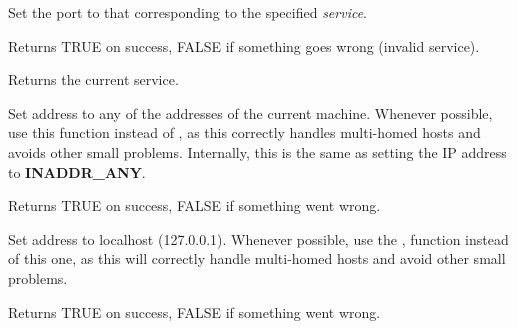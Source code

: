 %
%



Set the port to that corresponding to the specified {\it service}.


Returns TRUE on success, FALSE if something goes wrong
(invalid service).

%
%



Returns the current service.

%
%

\label{wxipv4addressanyaddress}


Set address to any of the addresses of the current machine. Whenever
possible, use this function instead of ,
as this correctly handles multi-homed hosts and avoids other small
problems. Internally, this is the same as setting the IP address
to {\bf INADDR\_ANY}.


Returns TRUE on success, FALSE if something went wrong.

%
%

\label{wxipv4addresslocalhost}


Set address to localhost (127.0.0.1). Whenever possible, use the 
,
function instead of this one, as this will correctly handle multi-homed
hosts and avoid other small problems.


Returns TRUE on success, FALSE if something went wrong.

